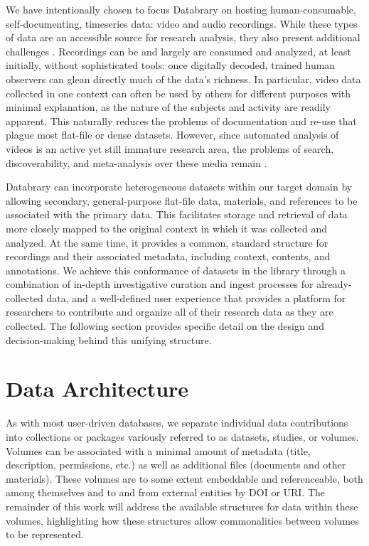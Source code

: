 \documentclass{sig-alternate}
\begin{document}
We have intentionally chosen to focus Databrary on hosting human-consumable, self-documenting, timeseries data: video and audio recordings.
While these types of data are an accessible source for research analysis, they also present additional challenges \cite{Lanagan_Smeaton_2012}.
Recordings can be and largely are consumed and analyzed, at least initially, without sophisticated tools: once digitally decoded, trained human observers can glean directly much of the data's richness.
In particular, video data collected in one context can often be used by others for different purposes with minimal explanation, as the nature of the subjects and activity are readily apparent.
This naturally reduces the problems of documentation and re-use that plague most flat-file or dense datasets.
However, since automated analysis of videos is an active yet still immature research area, the problems of search, discoverability, and meta-analysis over these media remain \cite{Albertson_2013}.


Databrary can incorporate heterogeneous datasets within our target domain by allowing secondary, general-purpose flat-file data, materials, and references to be associated with the primary data.
This facilitates storage and retrieval of data more closely mapped to the original context in which it was collected and analyzed.
At the same time, it provides a common, standard structure for recordings and their associated metadata, including context, contents, and annotations.
We achieve this conformance of datasets in the library through a combination of in-depth investigative curation and ingest processes for already-collected data, and a well-defined user experience that provides a platform for researchers to contribute and organize all of their research data as they are collected.
The following section provides specific detail on the design and decision-making behind this unifying structure.

\section{Data Architecture}


As with most user-driven databases, we separate individual data contributions into collections or packages variously referred to as datasets, studies, or volumes.
Volumes can be associated with a minimal amount of metadata (title, description, permissions, etc.) as well as additional files (documents and other materials).
These volumes are to some extent embeddable and referenceable, both among themselves and to and from external entities by DOI or URI.
The remainder of this work will address the available structures for data within these volumes, highlighting how these structures allow commonalities between volumes to be represented.
\end{document}
